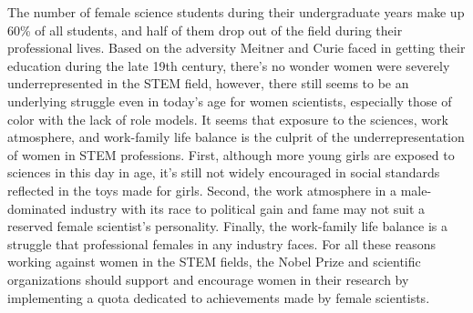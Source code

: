 \par
The number of female science students during their undergraduate years make up 60\% of all students, and half of them drop 
out of the field during their professional lives.\cite{drjemison} Based on the adversity Meitner and Curie faced in getting 
their education during the late 19th century, there’s no wonder women were severely underrepresented in the STEM field, however, 
there still seems to be an underlying struggle even in today’s age for women scientists, especially those of color with the lack of role 
models. It seems that exposure to the sciences, work atmosphere, and work-family life balance is the culprit of the underrepresentation 
of women in STEM professions. First, although more young girls are exposed to sciences in this day in age, it’s still not widely 
encouraged in social standards reflected in the toys made for girls. Second, the work atmosphere in a male-dominated industry with 
its race to political gain and fame may not suit a reserved female scientist’s personality. Finally, the work-family life balance 
is a struggle that professional females in any industry faces. For all these reasons working against women in the STEM fields, the 
Nobel Prize and scientific organizations should support and encourage women in their research by implementing a quota dedicated to 
achievements made by female scientists.